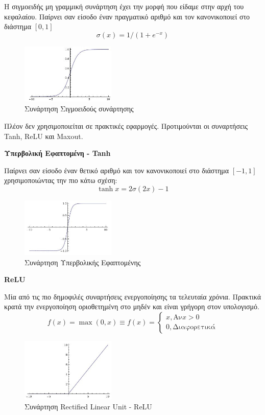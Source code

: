 Η σιγμοειδής μη γραμμική συνάρτηση έχει την μορφή που είδαμε στην αρχή του κεφαλαίου.
Παίρνει σαν είσοδο έναν πραγματικό αριθμό και τον κανονικοποιεί στο διάστημα $[0, 1]$
\[
  \sigma(x) = 1 / (1 + e^{-x})
\]

\begin{figure}[!ht]
  \centering
  \includegraphics[width=0.4\textwidth]{./images/chapter3/sigmoid.jpg}
  \caption[Συνάρτηση Σιγμοειδούς συνάρτησης]{Συνάρτηση Σιγμοειδούς συνάρτησης}
  \label{fig:sigmoid}
\end{figure}

Πλέον δεν χρησιμοποιείται σε πρακτικές εφαρμογές. Προτιμούνται οι συναρτήσεις
Tanh, ReLU και Maxout.

\textbf{Υπερβολική Εφαπτομένη - Tanh}

Παίρνει σαν είσοδο έναν θετικό αριθμό και τον κανονικοποιεί στο διάστημα $[-1, 1]$
χρησιμοποιώντας την πιο κάτω σχέση:
\[
  \tanh{x} = 2\sigma(2x) - 1
\]

\begin{figure}[!ht]
  \centering
  \includegraphics[width=0.4\textwidth]{./images/chapter3/tanh.jpg}
  \caption[Συνάρτηση Υπερβολικής Εφαπτωμένης]{Συνάρτηση Υπερβολικής Εφαπτομένης}
  \label{fig:tanh}
\end{figure}

\textbf{ReLU}

Μία από τις πιο δημοφιλές συναρτήσεις ενεργοποίησης τα τελευταία χρόνια.
Πρακτικά κρατά την ενεργοποίηση οριοθετημένη στο μηδέν και είναι
γρήγορη στον υπολογισμό.
\[
  f(x) = \max(0, x) \equiv f(x) =
  \begin{cases}
    x, \text{Αν} x > 0 \\
    0, \text{Διαφορετικά}
  \end{cases}
\]

\begin{figure}[!ht]
  \centering
  \includegraphics[width=0.4\textwidth]{./images/chapter3/relu.jpg}
  \caption[Συνάρτηση Rectified Linear Unit - ReLU]{Συνάρτηση Rectified Linear Unit - ReLU}
  \label{fig:relu}
\end{figure}

